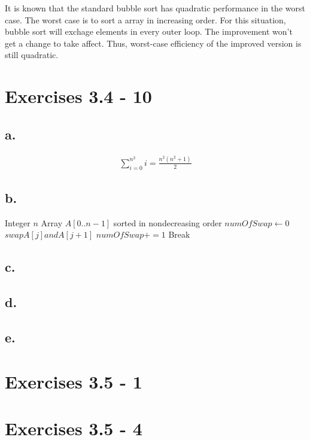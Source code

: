 \documentclass{article}
\begin{document}
It is known that the standard bubble sort has quadratic performance in the worst case. The worst case is to sort a array in increasing order. For this situation, bubble sort will exchage elements in every outer loop. The improvement won't get a change to take affect. Thus, worst-case efficiency of the improved version is still quadratic.

\section{Exercises 3.4 - 10}

\subsection{a.}

\begin{align*}
\sum_{i=0}^{n^2}i = \frac{n^2(n^2+1)}{2}
\end{align*}

\subsection{b.}

\begin{center}
\begin{algorithmic}
\INPUT
Integer $n$
\OUTPUT
Array $A[0..n-1]$ sorted in nondecreasing order
\State $numOfSwap \leftarrow 0$
\State $swap A[j] and A[j+1]$
\State $numOfSwap += 1$
\EndIf
\EndFor
{}
\State Break
\EndIf
\EndFor
\end{algorithmic}
\end{center}

\subsection{c.}


\subsection{d.}

\subsection{e.}

\section{Exercises 3.5 - 1}

\section{Exercises 3.5 - 4}
\end{document}
